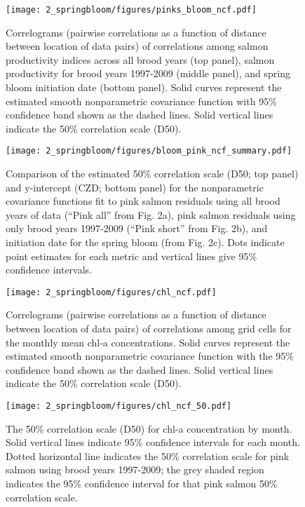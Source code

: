 \begin{figure}[htbp]
  \centering \texttt{[image: 2\_springbloom/figures/pinks\_bloom\_ncf.pdf]}
  \caption[Correlograms of correlations among salmon productivity
    indices and spring bloom initiation date.]{Correlograms (pairwise
    correlations as a function of distance between location of data pairs) of
    correlations among salmon productivity indices
    across all brood years (top panel), salmon productivity for brood years
    1997-2009 (middle panel), and spring bloom initiation date (bottom panel).
    Solid curves represent the estimated smooth nonparametric covariance
    function with 95\% confidence band shown as the dashed lines. Solid vertical
    lines indicate the 50\% correlation scale (D50).}
  \label{fig:bloom:2}
\end{figure}

\begin{figure}[htbp]
  \centering \texttt{[image: 2\_springbloom/figures/bloom\_pink\_ncf\_summary.pdf]}
  \caption[Comparison of the estimated 50\% correlation scale
    and y-intercept from the nonparametric covariance functions.]{Comparison of
    the estimated 50\% correlation scale (D50; 
    top panel) and y-intercept (CZD; bottom panel) for the nonparametric
    covariance functions fit to pink salmon residuals using all brood years of
    data (``Pink all'' from Fig. 2a), pink salmon residuals using only brood
    years 1997-2009 (``Pink short'' from Fig.  2b), and initiation date for the
    spring bloom (from Fig. 2c). Dots indicate point estimates for each metric
    and vertical lines give 95\% confidence intervals.}
  \label{fig:bloom:3}
\end{figure}

\begin{figure}[htbp]
  \centering \texttt{[image: 2\_springbloom/figures/chl\_ncf.pdf]}
  \caption[Correlograms of correlations among grid cells for the monthly
    mean chl-a concentrations.]{Correlograms (pairwise correlations as a
    function of distance between location of data pairs) of correlations among
    grid cells for the monthly mean chl-a concentrations. Solid curves represent
    the estimated smooth nonparametric covariance function with the 95\%
    confidence band shown as the dashed lines. Solid vertical lines indicate the
    50\% correlation scale (D50).}
  \label{fig:bloom:4}
\end{figure}

\begin{figure}[htbp]
  \centering \texttt{[image: 2\_springbloom/figures/chl\_ncf\_50.pdf]}
  \caption[The 50\% correlation scale for chl-a concentration by month.]{The
    50\% correlation scale (D50) for chl-a concentration by month.  Solid
    vertical lines indicate 95\% confidence intervals for each month.
    Dotted horizontal line indicates the 50\% correlation scale for pink salmon
    using brood years 1997-2009; the grey shaded region indicates the 95\%
    confidence interval for that pink salmon 50\% correlation scale.}
  \label{fig:bloom:5}
\end{figure}

